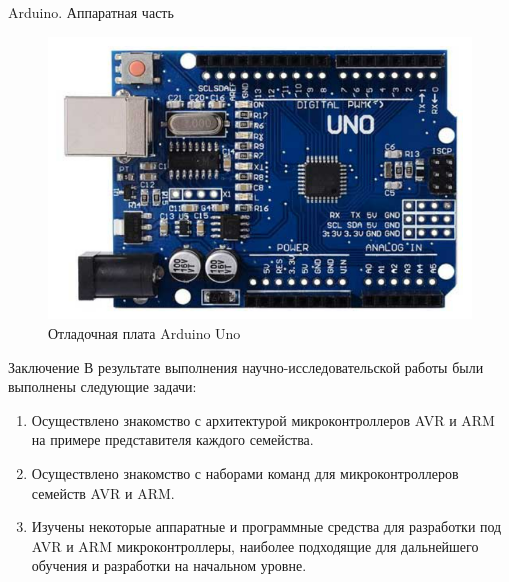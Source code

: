 \documentclass[12pt,a4paper,mathserif]{beamer}
\begin{document}
\begin{frame}{Arduino. Аппаратная часть}
    \begin{figure}
        \centering
        \includegraphics[scale=0.6]{Arduino_Uno.png}
        \caption{Отладочная плата Arduino Uno}
        \label{fig:uno}
    \end{figure}
\end{frame}

\begin{frame}{Заключение}
    \setlength{\parindent}{0.5cm}
    В результате выполнения научно-исследовательской работы были выполнены следующие задачи:

    \begin{enumerate}
        \item Осуществлено знакомство с архитектурой микроконтроллеров AVR и ARM на примере представителя каждого семейства.
        
        \item Осуществлено знакомство с наборами команд для микроконтроллеров семейств AVR и ARM.
        
        \item Изучены некоторые аппаратные и программные средства для разработки под AVR и ARM микроконтроллеры, наиболее подходящие для дальнейшего обучения и разработки на начальном уровне.
    \end{enumerate}
\end{frame}
\end{document}
